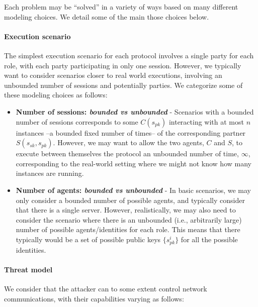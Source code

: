\documentclass[11pt]{article}
\newcommand{\sfsk}{\mathit{sk}}
\newcommand{\sfpk}{\mathit{pk}}
\begin{document}
Each problem may be ``solved'' in a variety of ways based on many different modeling choices. We detail some of the main those choices below.

\paragraph{Execution scenario} The simplest execution scenario for each protocol involves a single party for each role, with each party participating in only one session. However, we typically want to consider scenarios closer to real world executions, involving an unbounded number of sessions and potentially parties.
We categorize some of these modeling choices as follows:
\begin{itemize}
\item \textbf{Number of sessions: \emph{bounded vs unbounded}} - Scenarios with a bounded number of sessions corresponds to some $C(s_\sfpk)$ interacting with at most $n$ instances --a bounded fixed number of times-- of the corresponding partner $S(s_\sfsk,s_\sfpk)$. However, we may want to allow the two agents, $C$ and $S$, to execute between themselves the protocol an unbounded number of time, $\infty$, corresponding to the real-world setting where we might not know how many instances are running.
\item \textbf{Number of agents: \emph{bounded vs unbounded}} - In basic scenarios, we may only consider a bounded number of possible agents, and typically consider that there is a single server. However, realistically, we may also need to consider the scenario where there is an unbounded (i.e., arbitrarily large) number of possible agents/identities for each role. This means that there typically would be a set of possible public keys $\{s_\sfpk^i\}$ for all the possible identities.
\end{itemize}


\paragraph{Threat model}

We consider that the attacker can to some extent control network communications, with their capabilities varying as follows:
\end{document}

